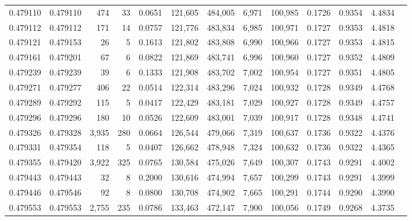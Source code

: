 \begin{tabular}{rrrrrrrrrrrrr}
0.479110 & 0.479110 &   474 &    33 &                                     0.0651 & 121,605 & 484,005 &   6,971 & 100,985 & 0.1726 & 0.9354 & 4.4834 \\
0.479112 & 0.479112 &   171 &    14 &                                     0.0757 & 121,776 & 483,834 &   6,985 & 100,971 & 0.1727 & 0.9353 & 4.4818 \\
0.479121 & 0.479153 &    26 &     5 &                                     0.1613 & 121,802 & 483,808 &   6,990 & 100,966 & 0.1727 & 0.9353 & 4.4815 \\
0.479161 & 0.479201 &    67 &     6 &                                     0.0822 & 121,869 & 483,741 &   6,996 & 100,960 & 0.1727 & 0.9352 & 4.4809 \\
0.479239 & 0.479239 &    39 &     6 &                                     0.1333 & 121,908 & 483,702 &   7,002 & 100,954 & 0.1727 & 0.9351 & 4.4805 \\
0.479271 & 0.479277 &   406 &    22 &                                     0.0514 & 122,314 & 483,296 &   7,024 & 100,932 & 0.1728 & 0.9349 & 4.4768 \\
0.479289 & 0.479292 &   115 &     5 &                                     0.0417 & 122,429 & 483,181 &   7,029 & 100,927 & 0.1728 & 0.9349 & 4.4757 \\
0.479296 & 0.479296 &   180 &    10 &                                     0.0526 & 122,609 & 483,001 &   7,039 & 100,917 & 0.1728 & 0.9348 & 4.4741 \\
0.479326 & 0.479328 & 3,935 &   280 &                                     0.0664 & 126,544 & 479,066 &   7,319 & 100,637 & 0.1736 & 0.9322 & 4.4376 \\
0.479331 & 0.479354 &   118 &     5 &                                     0.0407 & 126,662 & 478,948 &   7,324 & 100,632 & 0.1736 & 0.9322 & 4.4365 \\
0.479355 & 0.479420 & 3,922 &   325 &                                     0.0765 & 130,584 & 475,026 &   7,649 & 100,307 & 0.1743 & 0.9291 & 4.4002 \\
0.479443 & 0.479443 &    32 &     8 &                                     0.2000 & 130,616 & 474,994 &   7,657 & 100,299 & 0.1743 & 0.9291 & 4.3999 \\
0.479446 & 0.479546 &    92 &     8 &                                     0.0800 & 130,708 & 474,902 &   7,665 & 100,291 & 0.1744 & 0.9290 & 4.3990 \\
0.479553 & 0.479553 & 2,755 &   235 &                                     0.0786 & 133,463 & 472,147 &   7,900 & 100,056 & 0.1749 & 0.9268 & 4.3735 \\

\end{tabular}
